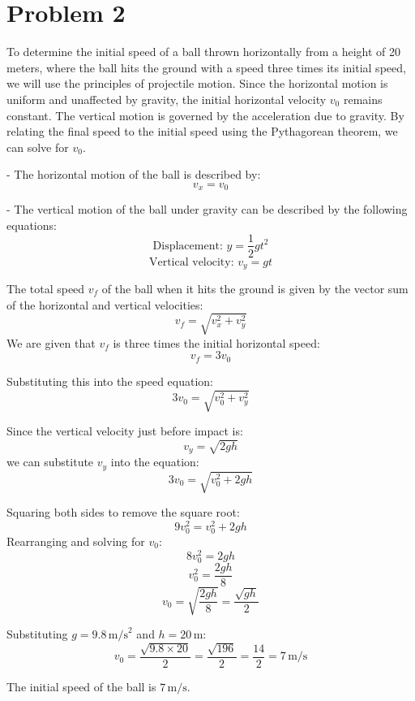 \section{Problem 2}

To determine the initial speed of a ball thrown horizontally from a height of 20 meters, where the ball hits the ground with a speed three times its initial speed, we will use the principles of projectile motion. Since the horizontal motion is uniform and unaffected by gravity, the initial horizontal velocity \(v_0\) remains constant. The vertical motion is governed by the acceleration due to gravity. By relating the final speed to the initial speed using the Pythagorean theorem, we can solve for \(v_0\).

- The horizontal motion of the ball is described by:
\[
v_x = v_0
\]

- The vertical motion of the ball under gravity can be described by the following equations:
  \[
  \text{Displacement: } y = \frac{1}{2} g t^2
  \]
  \[
  \text{Vertical velocity: } v_y = g t
  \]

The total speed \( v_f \) of the ball when it hits the ground is given by the vector sum of the horizontal and vertical velocities:
\[
v_f = \sqrt{v_x^2 + v_y^2}
\]
We are given that \( v_f \) is three times the initial horizontal speed:
\[
v_f = 3v_0
\]

Substituting this into the speed equation:
\[
3v_0 = \sqrt{v_0^2 + v_y^2}
\]

Since the vertical velocity just before impact is:
\[
v_y = \sqrt{2gh}
\]
we can substitute \( v_y \) into the equation:
\[
3v_0 = \sqrt{v_0^2 + 2gh}
\]

Squaring both sides to remove the square root:
\[
9v_0^2 = v_0^2 + 2gh
\]
Rearranging and solving for \( v_0 \):
\[
8v_0^2 = 2gh
\]
\[
v_0^2 = \frac{2gh}{8}
\]
\[
v_0 = \sqrt{\frac{2gh}{8}} = \frac{\sqrt{gh}}{2}
\]

Substituting \( g = 9.8 \, \text{m/s}^2 \) and \( h = 20 \, \text{m} \):
\[
v_0 = \frac{\sqrt{9.8 \times 20}}{2} = \frac{\sqrt{196}}{2} = \frac{14}{2} = 7 \, \text{m/s}
\]

The initial speed of the ball is \( \boxed{7 \, \text{m/s}} \).